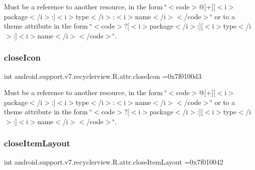 Must be a reference to another resource, in the form \char`\"{}$<$code$>$@\mbox{[}+\mbox{]}\mbox{[}$<$i$>$package$<$/i$>$\+:\mbox{]}$<$i$>$type$<$/i$>$\+:$<$i$>$name$<$/i$>$$<$/code$>$\char`\"{} or to a theme attribute in the form \char`\"{}$<$code$>$?\mbox{[}$<$i$>$package$<$/i$>$\+:\mbox{]}\mbox{[}$<$i$>$type$<$/i$>$\+:\mbox{]}$<$i$>$name$<$/i$>$$<$/code$>$\char`\"{}. \mbox{\label{classandroid_1_1support_1_1v7_1_1recyclerview_1_1R_1_1attr_a56d53d8df869f5ae22fa2a44f44cf637}} 
\subsubsection{\texorpdfstring{close\+Icon}{closeIcon}}
{\footnotesize\ttfamily int android.\+support.\+v7.\+recyclerview.\+R.\+attr.\+close\+Icon =0x7f0100d3\hspace{0.3cm}{\ttfamily [static]}}

Must be a reference to another resource, in the form \char`\"{}$<$code$>$@\mbox{[}+\mbox{]}\mbox{[}$<$i$>$package$<$/i$>$\+:\mbox{]}$<$i$>$type$<$/i$>$\+:$<$i$>$name$<$/i$>$$<$/code$>$\char`\"{} or to a theme attribute in the form \char`\"{}$<$code$>$?\mbox{[}$<$i$>$package$<$/i$>$\+:\mbox{]}\mbox{[}$<$i$>$type$<$/i$>$\+:\mbox{]}$<$i$>$name$<$/i$>$$<$/code$>$\char`\"{}. \mbox{\label{classandroid_1_1support_1_1v7_1_1recyclerview_1_1R_1_1attr_a654c9ca4dd9811de1dd03792a435c737}} 
\subsubsection{\texorpdfstring{close\+Item\+Layout}{closeItemLayout}}
{\footnotesize\ttfamily int android.\+support.\+v7.\+recyclerview.\+R.\+attr.\+close\+Item\+Layout =0x7f010042\hspace{0.3cm}{\ttfamily [static]}}

